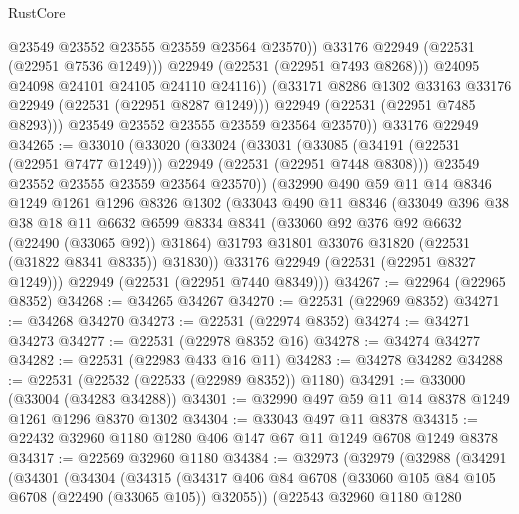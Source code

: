 \begin{lexlean}{RustCore}
\begin{coremodule}
                      @23549
                      @23552
                      @23555
                      @23559
                      @23564
                      @23570))
                  @33176
                  @22949
                  (@22531 (@22951 @7536 @1249)))
                @22949
                (@22531 (@22951 @7493 @8268)))
              @24095
              @24098
              @24101
              @24105
              @24110
              @24116))
          (@33171 @8286 @1302 @33163 @33176 @22949 (@22531 (@22951 @8287 @1249)))
          @22949
          (@22531 (@22951 @7485 @8293)))
        @23549
        @23552
        @23555
        @23559
        @23564
        @23570))
    @33176
    @22949
@34265 := @33010
    (@33020
      (@33024
        (@33031
          (@33085 (@34191 (@22531 (@22951 @7477 @1249))) @22949 (@22531 (@22951 @7448 @8308)))
          @23549
          @23552
          @23555
          @23559
          @23564
          @23570))
      (@32990
        @490
        @59
        @11
        @14
        @8346
        @1249
        @1261
        @1296
        @8326
        @1302
        (@33043
          @490
          @11
          @8346
          (@33049
            @396
            @38
            @38
            @18
            @11
            @6632
            @6599
            @8334
            @8341
            (@33060 @92 @376 @92 @6632 (@22490 (@33065 @92)) @31864)
            @31793
            @31801
            @33076
            @31820
            (@22531 (@31822 @8341 @8335))
            @31830))
        @33176
        @22949
        (@22531 (@22951 @8327 @1249)))
      @22949
      (@22531 (@22951 @7440 @8349)))
@34267 := @22964 (@22965 @8352)
@34268 := @34265 @34267
@34270 := @22531 (@22969 @8352)
@34271 := @34268 @34270
@34273 := @22531 (@22974 @8352)
@34274 := @34271 @34273
@34277 := @22531 (@22978 @8352 @16)
@34278 := @34274 @34277
@34282 := @22531 (@22983 @433 @16 @11)
@34283 := @34278 @34282
@34288 := @22531 (@22532 (@22533 (@22989 @8352)) @1180)
@34291 := @33000 (@33004 (@34283 @34288))
@34301 := @32990 @497 @59 @11 @14 @8378 @1249 @1261 @1296 @8370 @1302
@34304 := @33043 @497 @11 @8378
@34315 := @22432 @32960 @1180 @1280 @406 @147 @67 @11 @1249 @6708 @1249 @8378
@34317 := @22569 @32960 @1180
@34384 := @32973
    (@32979
      (@32988
        (@34291
          (@34301
            (@34304
              (@34315
                (@34317 @406 @84 @6708 (@33060 @105 @84 @105 @6708 (@22490 (@33065 @105)) @32055))
                (@22543
                  @32960
                  @1180
                  @1280

\end{coremodule}
\end{lexlean}
